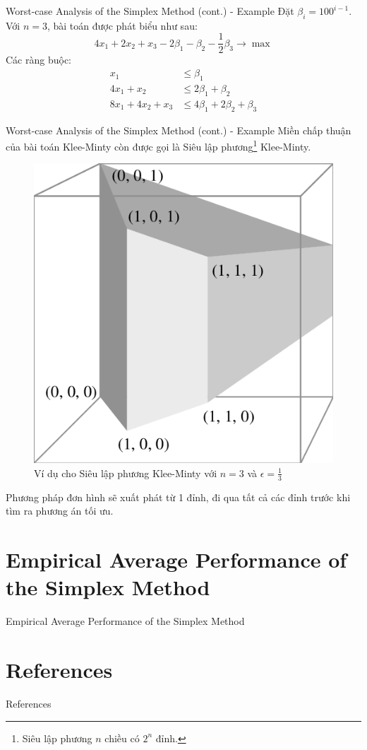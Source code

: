 \documentclass[10pt]{beamer}
\begin{document}
\begin{frame}{Worst-case Analysis of the Simplex Method (cont.) - Example}
Đặt $\beta_i = 100^{i - 1}$. Với $n = 3$, bài toán được phát biểu như sau:
$$
4x_1 + 2x_2 + x_3 - 2\beta_1 - \beta_2 - \frac{1}{2}\beta_3 \rightarrow \max
$$
Các ràng buộc:
$$
\begin{aligned}
x_1 &\leq \beta_1\\
4x_1 + x_2 &\leq 2\beta_1 + \beta_2\\
8x_1 + 4x_2 + x_3 &\leq 4\beta_1 + 2\beta_2 + \beta_3
\end{aligned}
$$
\end{frame}

\begin{frame}{Worst-case Analysis of the Simplex Method (cont.) - Example}
Miền chấp thuận của bài toán Klee-Minty còn được gọi là Siêu lập phương\footnote{Siêu lập phương $n$ chiều có $2^n$ đỉnh.} Klee-Minty.
\begin{figure}
\includegraphics[scale=.15]{img/klee-minty-cube.png}
\caption{Ví dụ cho Siêu lập phương Klee-Minty với $n = 3$ và $\epsilon = \frac{1}{3}$}
\end{figure}
Phương pháp đơn hình sẽ xuất phát từ 1 đỉnh, đi qua tất cả các đỉnh trước khi tìm ra phương án tối ưu.
\end{frame}

\section{Empirical Average Performance of the Simplex Method}
\begin{frame}{Empirical Average Performance of the Simplex Method}

\end{frame}

\section{References}
\begin{frame}[allowframebreaks]{References}
\printbibliography
\end{frame}
\end{document}
